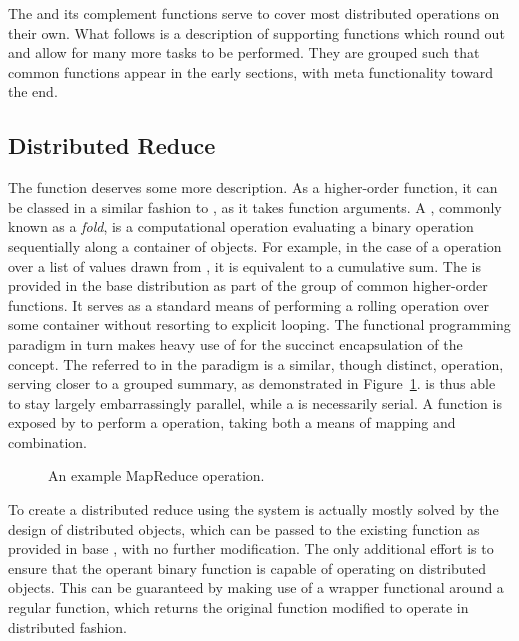 The  and its complement  functions serve to cover most distributed operations on their own.
What follows is a description of supporting functions which round out and allow for many more tasks to be performed.
They are grouped such that common functions appear in the early sections, with meta functionality toward the end.

\subsection{Distributed Reduce}

The  function deserves some more description.
As a higher-order function, it can be classed in a similar fashion to , as it takes function arguments.
A , commonly known as a \textit{fold}, is a computational operation evaluating a binary operation sequentially along a container of objects\cite{bird2010pearls}.
For example, in the case of a \code{+} operation over a list of values drawn from \tbb, it is equivalent to a cumulative sum.
The  is provided in the base  distribution as part of the  group of common higher-order functions.
It serves as a standard means of performing a rolling operation over some container without resorting to explicit looping.
The functional programming paradigm in turn makes heavy use of  for the succinct encapsulation of the concept.
The  referred to in the  paradigm is a similar, though distinct, operation, serving closer to a grouped summary\cite{dean2004mapreduce}, as demonstrated in Figure~\cref{fig:mapreduce}.
 is thus able to stay largely embarrassingly parallel, while a  is necessarily serial.
A  function is exposed by \lsr to perform a  operation, taking both a means of mapping and combination.

\begin{figure}[H]
\begin{center}

\caption{An example MapReduce operation.}
\label{fig:mapreduce}
\end{center}
\end{figure}

To create a distributed reduce using the \lsr{} system is actually mostly solved by the design of distributed objects, which can be passed to the existing  function as provided in base \R{}, with no further modification.
The only additional effort is to ensure that the operant binary function is capable of operating on distributed objects.
This can be guaranteed by making use of a  wrapper functional around a regular function, which returns the original function modified to operate in distributed fashion. 

